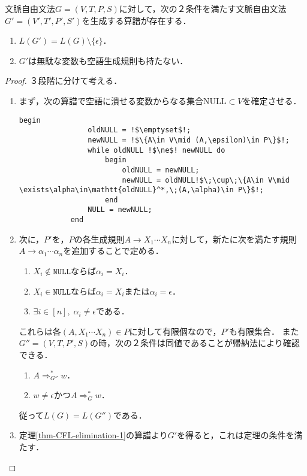 \begin{theorem}\label{thm-CFL-elimination-2}
    文脈自由文法$G=(V,T,P,S)$に対して，次の２条件を満たす文脈自由文法
    $G'=(V',T',P',S')$を生成する算譜が存在する．
    \begin{enumerate}
        \item $L(G')=L(G)\setminus\{\epsilon\}$．
        \item $G'$は無駄な変数も空語生成規則も持たない．
    \end{enumerate}
\end{theorem}
\begin{proof}３段階に分けて考える．
    \begin{enumerate}
        \item まず，次の算譜で空語に潰せる変数からなる集合NULL$\subset V$を確定させる．
        \begin{lstlisting}[escapechar=!]
            begin
                oldNULL = !$\emptyset$!;
                newNULL = !$\{A\in V\mid (A,\epsilon)\in P\}$!;
                while oldNULL !$\ne$! newNULL do
                    begin
                        oldNULL = newNULL;
                        newNULL = oldNULL!$\;\cup\;\{A\in V\mid \exists\alpha\in\mathtt{oldNULL}^*,\;(A,\alpha)\in P\}$!;
                    end
                NULL = newNULL;
            end
        \end{lstlisting}
        \item 次に，$P'$を，$P$の各生成規則$A\to X_1\cdots X_n$に対して，新たに次を満たす規則$A\to\alpha_1\cdots\alpha_n$を追加することで定める．
        \begin{enumerate}[(1)]
            \item $X_i\notin\mathtt{NULL}$ならば$\alpha_i=X_i$．
            \item $X_i\in\mathtt{NULL}$ならば$\alpha_i=X_i$または$\alpha_i=\epsilon$．
            \item $\exists i\in[n],\;\alpha_i\ne\epsilon$である．
        \end{enumerate}
        これらは各$(A,X_1\cdots X_n)\in P$に対して有限個なので，$P'$も有限集合．
        また$G''=(V,T,P',S)$の時，次の２条件は同値であることが帰納法により確認できる．
        \begin{enumerate}[(1)]
            \item $A\Rightarrow^*_{G''}w$．
            \item $w\ne\epsilon$かつ$A\Rightarrow^*_Gw$．
        \end{enumerate}
        従って$L(G)=L(G'')$である．
        \item 定理\ref{thm-CFL-elimination-1}の算譜より$G'$を得ると，これは定理の条件を満たす．
    \end{enumerate}
\end{proof}

